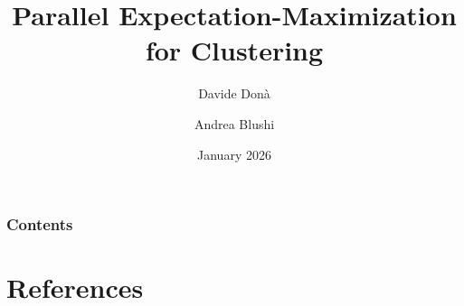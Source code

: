 \documentclass[10pt]{beamer}
\begin{document}
\title[January 2026]{Parallel Expectation-Maximization for Clustering}
\author[University of Trento]{Davide Donà \and Andrea Blushi}


\date[]
{January 2026}

\frame{\titlepage}
\begin{frame}
\frametitle{Contents}
\tableofcontents
\end{frame}








\section*{References}  
\begin{frame}
\nocite{*}
 
\small{}
\end{frame}
\end{document}
